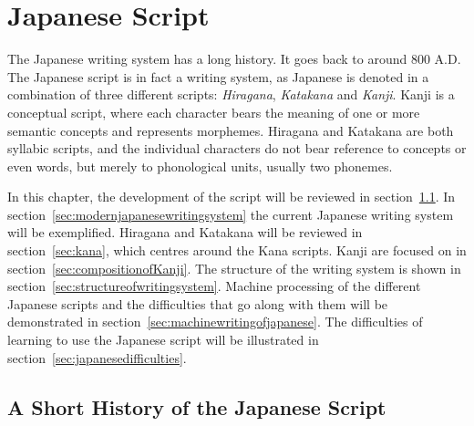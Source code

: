 
\chapter{Japanese Script}
\label{chap:japanasescript}


The Japanese writing system has a long history. It goes back to around 800 A.D. 
The Japanese script is in fact a writing system, as Japanese is denoted in 
a combination of three different scripts: \emph{Hiragana}, \emph{Katakana} and 
\emph{Kanji}. Kanji is a conceptual script, where each character bears the 
meaning of one or more semantic concepts and represents morphemes. 
Hiragana and Katakana are both syllabic scripts, and the individual characters do
not bear reference to concepts or even words, but merely to phonological units, 
usually two phonemes.

In this chapter, the development of the script will be reviewed in 
section~\ref{sec:ashorthistoryofjapanesewritingsystem}.
In section~\ref{sec:modernjapanesewritingsystem} the current Japanese writing 
system will be exemplified.
Hiragana and Katakana will be reviewed in
section~\ref{sec:kana}, which centres around the Kana scripts. 
Kanji are focused on in section~\ref{sec:compositionofKanji}. 
The structure of the writing system is shown in 
section~\ref{sec:structureofwritingsystem}.
Machine processing of the different Japanese scripts and the difficulties that
go along with them will be demonstrated in 
section~\ref{sec:machinewritingofjapanese}.
The difficulties of learning to use the Japanese script will be illustrated in 
section~\ref{sec:japanesedifficulties}.

\section{A Short History of the Japanese Script}
\label{sec:ashorthistoryofjapanesewritingsystem}

